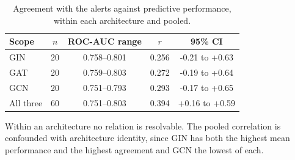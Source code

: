 \begin{table}[htbp]
\centering
\caption{Agreement with the alerts against predictive performance, within each architecture and pooled.}
\label{tab:performance}
\small
\setlength{\tabcolsep}{4pt}
\begin{tabular}{lcccc}
\toprule
Scope & $n$ & ROC-AUC range & $r$ & 95\% CI \\
\midrule
GIN & 20 & 0.758--0.801 & 0.256 & -0.21 to +0.63 \\
GAT & 20 & 0.759--0.803 & 0.272 & -0.19 to +0.64 \\
GCN & 20 & 0.751--0.793 & 0.293 & -0.17 to +0.65 \\
All three & 60 & 0.751--0.803 & 0.394 & +0.16 to +0.59 \\
\bottomrule
\end{tabular}
\begin{flushleft}\footnotesize Within an architecture no relation is resolvable. The pooled correlation is confounded with architecture identity, since GIN has both the highest mean performance and the highest agreement and GCN the lowest of each.\end{flushleft}
\end{table}
